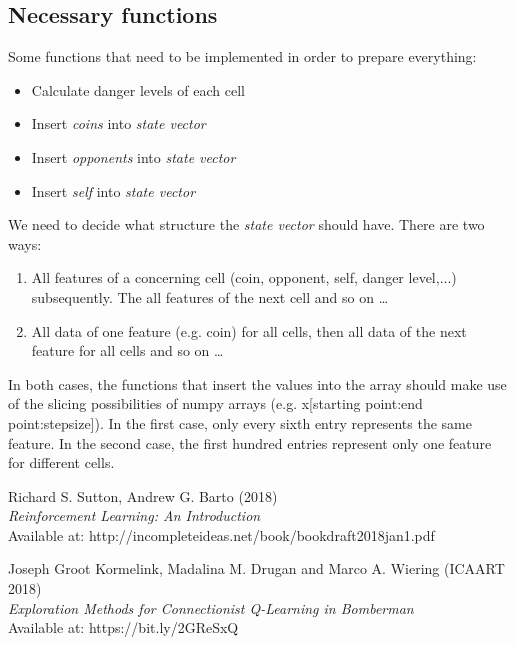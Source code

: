 \documentclass[12pt]{report}
\newcommand{\code}[1]{{\fontfamily{pcr}\selectfont #1}}
\begin{document}
\subsection{Necessary functions}
Some functions that need to be implemented in order to prepare everything:
\begin{itemize}
	\item Calculate danger levels of each cell
	\item Insert \textit{coins} into \textit{state vector}
	\item Insert \textit{opponents} into \textit{state vector}
	\item Insert \textit{self} into \textit{state vector}
\end{itemize}
We need to decide what structure the \textit{state vector} should have. There are two ways:
\begin{enumerate}
	\item All features of a concerning cell (coin, opponent, self, danger level,...) subsequently. The all features of the next cell and so on \dots
	\item All data of one feature (e.g. coin) for all cells, then all data of the next feature for all cells and so on \dots
\end{enumerate}
In both cases, the functions that insert the values into the array should make use of the slicing possibilities of numpy arrays (e.g. \code{x[starting point:end point:stepsize]}). In the first case, only every sixth entry represents the same feature. In the second case, the first hundred entries represent only one feature for different cells.


\begin{thebibliography}{111}
   



Richard S. Sutton, Andrew G. Barto (2018)\\
\textit{Reinforcement Learning: An Introduction}\\
Available at: http://incompleteideas.net/book/bookdraft2018jan1.pdf

Joseph Groot Kormelink, Madalina M. Drugan and Marco A. Wiering (ICAART 2018)\\
\textit{Exploration Methods for Connectionist Q-Learning in Bomberman}\\
Available at: https://bit.ly/2GReSxQ
\end{thebibliography}
\end{document}
